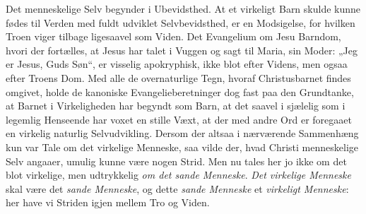 \documentclass[12pt]{book}
\begin{document}
Det menneskelige Selv begynder i Ubevidsthed. At et virkeligt Barn
skulde kunne fødes til Verden med fuldt udviklet Selvbevidsthed, er
en Modsigelse, for hvilken Troen viger tilbage ligesaavel som Viden.
Det Evangelium om Jesu Barndom, hvori der fortælles, at Jesus har
talet i Vuggen og sagt til Maria, sin Moder: „Jeg er Jesus, Guds
Søn“, er visselig apokryphisk, ikke blot efter Videns, men ogsaa
efter Troens Dom. Med alle de overnaturlige Tegn, hvoraf
Christusbarnet findes omgivet, holde de kanoniske
Evangelieberetninger dog fast paa den Grundtanke, at Barnet i
Virkeligheden har begyndt som Barn, at det saavel i sjælelig som i
legemlig Henseende har voxet en stille Væxt, at der med andre Ord er
foregaaet en virkelig naturlig Selvudvikling. Dersom der altsaa i
nærværende Sammenhæng kun var Tale om det virkelige Menneske, saa
vilde der, hvad Christi menneskelige Selv angaaer, umulig kunne være
nogen Strid. Men nu tales her jo ikke om det blot virkelige, men
udtrykkelig \emph{om det sande Menneske}. \emph{Det virkelige
Menneske} skal være det \emph{sande Menneske}, og dette \emph{sande
Menneske} et \emph{virkeligt Menneske}: her have vi Striden igjen
mellem Tro og Viden.
\end{document}
